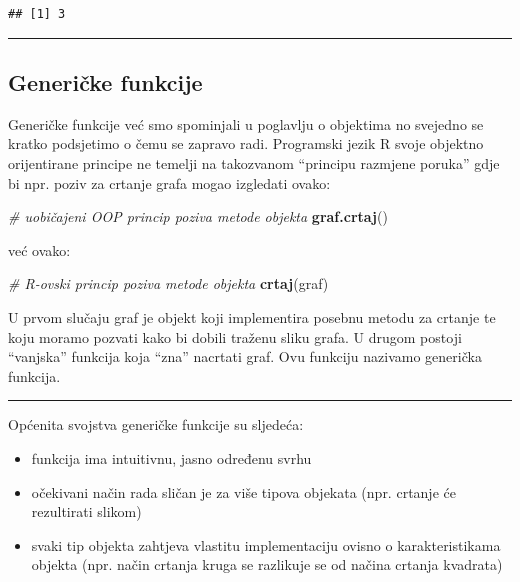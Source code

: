 \documentclass[]{book}
\newenvironment{Shaded}{\begin{snugshade}}{\end{snugshade}}
\newcommand{\KeywordTok}[1]{\textcolor[rgb]{0.13,0.29,0.53}{\textbf{#1}}}
\newcommand{\CommentTok}[1]{\textcolor[rgb]{0.56,0.35,0.01}{\textit{#1}}}
\newcommand{\NormalTok}[1]{#1}
\providecommand{\tightlist}{%
  \setlength{\itemsep}{0pt}\setlength{\parskip}{0pt}}
\theoremstyle{definition}
\theoremstyle{definition}
\theoremstyle{definition}
\theoremstyle{remark}
\begin{document}
\begin{verbatim}
## [1] 3
\end{verbatim}

\begin{center}\rule{0.5\linewidth}{\linethickness}\end{center}

\subsection{Generičke funkcije}\label{genericke-funkcije}

Generičke funkcije već smo spominjali u poglavlju o objektima no
svejedno se kratko podsjetimo o čemu se zapravo radi. Programski jezik R
svoje objektno orijentirane principe ne temelji na takozvanom ``principu
razmjene poruka'' gdje bi npr. poziv za crtanje grafa mogao izgledati
ovako:

\begin{Shaded}
\begin{Highlighting}[]
\CommentTok{# uobičajeni OOP princip poziva metode objekta}
\KeywordTok{graf.crtaj}\NormalTok{()}
\end{Highlighting}
\end{Shaded}

već ovako:

\begin{Shaded}
\begin{Highlighting}[]
\CommentTok{# R-ovski princip poziva metode objekta}
\KeywordTok{crtaj}\NormalTok{(graf)}
\end{Highlighting}
\end{Shaded}

U prvom slučaju graf je objekt koji implementira posebnu metodu za
crtanje te koju moramo pozvati kako bi dobili traženu sliku grafa. U
drugom postoji ``vanjska'' funkcija koja ``zna'' nacrtati graf. Ovu
funkciju nazivamo generička funkcija.

\begin{center}\rule{0.5\linewidth}{\linethickness}\end{center}

Općenita svojstva generičke funkcije su sljedeća:

\begin{itemize}
\tightlist
\item
  funkcija ima intuitivnu, jasno određenu svrhu
\item
  očekivani način rada sličan je za više tipova objekata (npr. crtanje
  će rezultirati slikom)
\item
  svaki tip objekta zahtjeva vlastitu implementaciju ovisno o
  karakteristikama objekta (npr. način crtanja kruga se razlikuje se od
  načina crtanja kvadrata)
\end{itemize}
\end{document}
